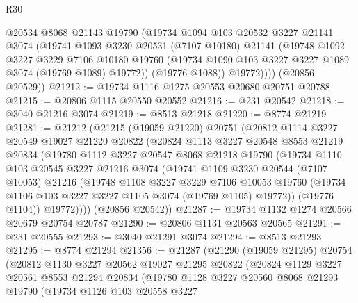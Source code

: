 \begin{lexlean}{R30}
\begin{coremodule}
            @20534
            @8068
            @21143
            @19790
            (@19734
              @1094
              @103
              @20532
              @3227
              @21141
              @3074
              (@19741
                @1093
                @3230
                @20531
                (@7107 @10180)
                @21141
                (@19748
                  @1092
                  @3227
                  @3229
                  @7106
                  @10180
                  @19760
                  (@19734 @1090 @103 @3227 @3227 @1089 @3074 (@19769 @1089) @19772))
                (@19776 @1088))
              @19772))))
      (@20856 @20529))
@21212 := @19734 @1116 @1275 @20553 @20680 @20751 @20788
@21215 := @20806 @1115 @20550 @20552
@21216 := @231 @20542
@21218 := @3040 @21216 @3074
@21219 := @8513 @21218
@21220 := @8774 @21219
@21281 := @21212
    (@21215
      (@19059 @21220)
      @20751
      (@20812
        @1114
        @3227
        @20549
        @19027
        @21220
        @20822
        (@20824
          @1113
          @3227
          @20548
          @8553
          @21219
          @20834
          (@19780
            @1112
            @3227
            @20547
            @8068
            @21218
            @19790
            (@19734
              @1110
              @103
              @20545
              @3227
              @21216
              @3074
              (@19741
                @1109
                @3230
                @20544
                (@7107 @10053)
                @21216
                (@19748
                  @1108
                  @3227
                  @3229
                  @7106
                  @10053
                  @19760
                  (@19734 @1106 @103 @3227 @3227 @1105 @3074 (@19769 @1105) @19772))
                (@19776 @1104))
              @19772))))
      (@20856 @20542))
@21287 := @19734 @1132 @1274 @20566 @20679 @20754 @20787
@21290 := @20806 @1131 @20563 @20565
@21291 := @231 @20555
@21293 := @3040 @21291 @3074
@21294 := @8513 @21293
@21295 := @8774 @21294
@21356 := @21287
    (@21290
      (@19059 @21295)
      @20754
      (@20812
        @1130
        @3227
        @20562
        @19027
        @21295
        @20822
        (@20824
          @1129
          @3227
          @20561
          @8553
          @21294
          @20834
          (@19780
            @1128
            @3227
            @20560
            @8068
            @21293
            @19790
            (@19734
              @1126
              @103
              @20558
              @3227

\end{coremodule}
\end{lexlean}
